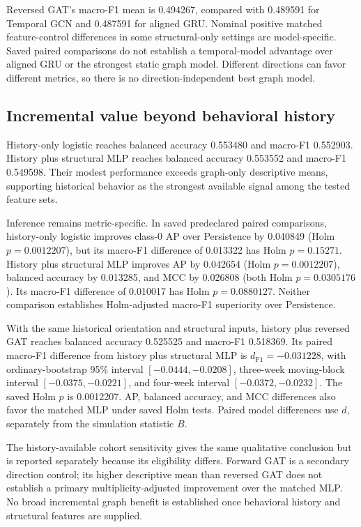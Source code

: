 \documentclass[11pt,a4paper]{article}
\begin{document}
Reversed GAT's macro-F1 mean is 0.494267, compared with 0.489591 for Temporal GCN and 0.487591 for aligned GRU. Nominal positive matched feature-control differences in some structural-only settings are model-specific. Saved paired comparisons do not establish a temporal-model advantage over aligned GRU or the strongest static graph model. Different directions can favor different metrics, so there is no direction-independent best graph model.

\subsection{Incremental value beyond behavioral history}
History-only logistic reaches balanced accuracy 0.553480 and macro-F1 0.552903. History plus structural MLP reaches balanced accuracy 0.553552 and macro-F1 0.549598. Their modest performance exceeds graph-only descriptive means, supporting historical behavior as the strongest available signal among the tested feature sets.

Inference remains metric-specific. In saved predeclared paired comparisons, history-only logistic improves class-0 AP over Persistence by 0.040849 (Holm $p=0.0012207$), but its macro-F1 difference of 0.013322 has Holm $p=0.15271$. History plus structural MLP improves AP by 0.042654 (Holm $p=0.0012207$), balanced accuracy by 0.013285, and MCC by 0.026808 (both Holm $p=0.0305176$). Its macro-F1 difference of 0.010017 has Holm $p=0.0880127$. Neither comparison establishes Holm-adjusted macro-F1 superiority over Persistence.

With the same historical orientation and structural inputs, history plus reversed GAT reaches balanced accuracy 0.525525 and macro-F1 0.518369. Its paired macro-F1 difference from history plus structural MLP is $d_{\mathrm{F1}}=-0.031228$, with ordinary-bootstrap 95\% interval $[-0.0444,-0.0208]$, three-week moving-block interval $[-0.0375,-0.0221]$, and four-week interval $[-0.0372,-0.0232]$. The saved Holm $p$ is 0.0012207. AP, balanced accuracy, and MCC differences also favor the matched MLP under saved Holm tests. Paired model differences use $d$, separately from the simulation statistic $B$.

The history-available cohort sensitivity gives the same qualitative conclusion but is reported separately because its eligibility differs. Forward GAT is a secondary direction control; its higher descriptive mean than reversed GAT does not establish a primary multiplicity-adjusted improvement over the matched MLP. No broad incremental graph benefit is established once behavioral history and structural features are supplied.
\end{document}
